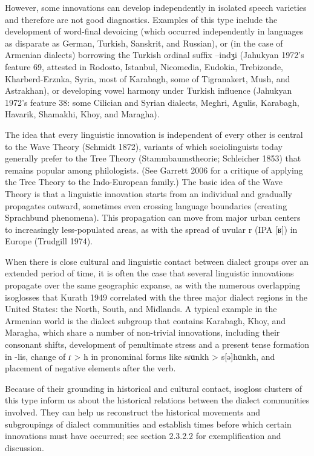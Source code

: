 However, some innovations can develop independently in isolated speech varieties and therefore are not good diagnostics. Examples of this type include the development of word-final devoicing (which occurred independently in languages as disparate as German, Turkish, Sanskrit, and Russian), or (in the case of Armenian dialects) borrowing the Turkish ordinal suffix –indʒi (Jahukyan 1972’s feature 69, attested in Rodosto, Istanbul, Nicomedia, Eudokia, Trebizonde, Kharberd-Erznka, Syria, most of Karabagh, some of Tigranakert, Mush, and Astrakhan), or developing vowel harmony under Turkish influence (Jahukyan 1972’s feature 38: some Cilician and Syrian dialects, Meghri, Agulis, Karabagh, Havarik, Shamakhi, Khoy, and Maragha).

The idea that every linguistic innovation is independent of every other is central to the Wave Theory (Schmidt 1872), variants of which sociolinguists today generally prefer to the Tree Theory (Stammbaumstheorie; Schleicher 1853) that remains popular among philologists. (See Garrett 2006 for a critique of applying the Tree Theory to the Indo-European family.) The basic idea of the Wave Theory is that a linguistic innovation starts from an individual and gradually propagates outward, sometimes even crossing language boundaries (creating Sprachbund phenomena).  This propagation can move from major urban centers to increasingly less-populated areas, as with the spread of uvular r (IPA [ʁ]) in Europe (Trudgill 1974).

When there is close cultural and linguistic contact between dialect groups over an extended period of time, it is often the case that several linguistic innovations propagate over the same geographic expanse, as with the numerous overlapping isoglosses that Kurath 1949 correlated with the three major dialect regions in the United States: the North, South, and Midlands. A typical example in the Armenian world is the dialect subgroup that contains Karabagh, Khoy, and Maragha, which share a number of non-trivial innovations, including their consonant shifts, development of penultimate stress and a present tense formation in -lis, change of ɾ > h in pronominal forms like sɾɑnkh > s[ə]hɑnkh, and placement of negative elements after the verb.

Because of their grounding in historical and cultural contact, isogloss clusters of this type inform us about the historical relations between the dialect communities involved. They can help us reconstruct the historical movements and subgroupings of dialect communities and establish times before which certain innovations must have occurred; see section 2.3.2.2 for exemplification and discussion.


